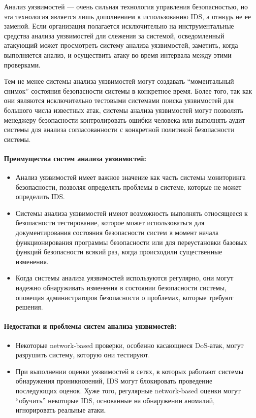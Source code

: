 Анализ уязвимостей — очень сильная технология управления безопасностью, но эта технология является лишь дополнением к использованию IDS, а отнюдь не ее заменой. Если организация полагается исключительно на инструментальные средства анализа уязвимостей для слежения за системой, осведомленный атакующий может просмотреть систему анализа уязвимостей, заметить, когда выполняется анализ, и осуществить атаку во время интервала между этими проверками. 

Тем не менее системы анализа уязвимостей могут создавать ``моментальный снимок'' состояния безопасности системы в конкретное время. Более того, так как они являются исключительно тестовыми системами поиска уязвимостей для большого числа известных атак, системы анализа уязвимостей могут позволять менеджеру безопасности контролировать ошибки человека или выполнять аудит системы для анализа согласованности с конкретной политикой безопасности системы.

\paragraph*{Преимущества систем анализа уязвимостей:}

\begin{itemize}
	\item Анализ уязвимостей имеет важное значение как часть системы мониторинга безопасности, позволяя определять проблемы в системе, которые не может определить IDS.

	\item Системы анализа уязвимостей имеют возможность выполнять относящееся к безопасности тестирование, которое может использоваться для документирования состояния безопасности систем в момент начала функционирования программы безопасности или для переустановки базовых функций безопасности всякий раз, когда происходили существенные изменения.
	
	\item Когда системы анализа уязвимостей используются регулярно, они могут надежно обнаруживать изменения в состоянии безопасности системы, оповещая администраторов безопасности о проблемах, которые требуют решения.
\end{itemize}


\paragraph*{Недостатки и проблемы систем анализа уязвимостей:}

\begin{itemize}
	\item Некоторые network-based проверки, особенно касающиеся DoS-атак, могут разрушить систему, которую они тестируют.

	\item При выполнении оценки уязвимостей в сетях, в которых работают системы обнаружения проникновений, IDS могут блокировать проведение последующих оценок. Хуже того, регулярные network-based оценки могут ``обучить'' некоторые IDS, основанные на обнаружении аномалий, игнорировать реальные атаки.
\end{itemize}


